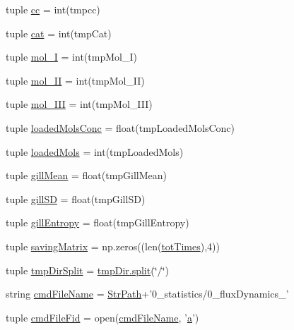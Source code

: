 \begin{DoxyCompactItemize}
tuple \hyperlink{namespacebuffered_flux_analysis_a81b885fbd3a11be21610fd96c82952b7}{cc} = int(tmpcc)
\item 
tuple \hyperlink{namespacebuffered_flux_analysis_a651bc7229b13b20528ca1a79030c6ac7}{cat} = int(tmp\-Cat)
\item 
tuple \hyperlink{namespacebuffered_flux_analysis_a64e0bf7f508f99df9f78726bb69f39fc}{mol\-\_\-\-I} = int(tmp\-Mol\-\_\-\-I)
\item 
tuple \hyperlink{namespacebuffered_flux_analysis_a608780773cb877189c0d288e25bbc3f3}{mol\-\_\-\-I\-I} = int(tmp\-Mol\-\_\-\-I\-I)
\item 
tuple \hyperlink{namespacebuffered_flux_analysis_adb2a3012a89917afb7db45899a9b3e77}{mol\-\_\-\-I\-I\-I} = int(tmp\-Mol\-\_\-\-I\-I\-I)
\item 
tuple \hyperlink{namespacebuffered_flux_analysis_a7e05b85cf7e9b63ac9aa0582932185b4}{loaded\-Mols\-Conc} = float(tmp\-Loaded\-Mols\-Conc)
\item 
tuple \hyperlink{namespacebuffered_flux_analysis_ae753e3b6694200ad57523072a4a2dbf1}{loaded\-Mols} = int(tmp\-Loaded\-Mols)
\item 
tuple \hyperlink{namespacebuffered_flux_analysis_ab95141737b50ec6e5b0e3f622dfa9713}{gill\-Mean} = float(tmp\-Gill\-Mean)
\item 
tuple \hyperlink{namespacebuffered_flux_analysis_a74dcc41e82d94dda58e3e18fd94b9563}{gill\-S\-D} = float(tmp\-Gill\-S\-D)
\item 
tuple \hyperlink{namespacebuffered_flux_analysis_ac596e19c308944b3c5504e92aa074de1}{gill\-Entropy} = float(tmp\-Gill\-Entropy)
\item 
tuple \hyperlink{namespacebuffered_flux_analysis_a20f8e8350b77ca9121474e7177166800}{saving\-Matrix} = np.\-zeros((len(\hyperlink{namespacebuffered_flux_analysis_a11c5182cf16d185b8ebd807aff4eb839}{tot\-Times}),4))
\item 
tuple \hyperlink{namespacebuffered_flux_analysis_ab710247ed928de0924b2123e6aec97c9}{tmp\-Dir\-Split} = \hyperlink{common_functions_8h_a4d1aa74fac80ae0275c056575fdb6626}{tmp\-Dir.\-split}(\char`\"{}/\char`\"{})
\item 
string \hyperlink{namespacebuffered_flux_analysis_af2f4a5ec3f690f7a60ea69a5cb208359}{cmd\-File\-Name} = \hyperlink{namespacebuffered_flux_analysis_a86b649a1e51f1e3384ad432c0de3340b}{Str\-Path}+'0\-\_\-statistics/0\-\_\-flux\-Dynamics\-\_\-'
\item 
tuple \hyperlink{namespacebuffered_flux_analysis_a6b17587fb0cc6eb8ae770e1dbc5b1d97}{cmd\-File\-Fid} = open(\hyperlink{namespacebuffered_flux_analysis_af2f4a5ec3f690f7a60ea69a5cb208359}{cmd\-File\-Name}, '\hyperlink{somma_8m_a2ffdbad9ea59541e59cbd2b938e0770c}{a}')
\end{DoxyCompactItemize}


